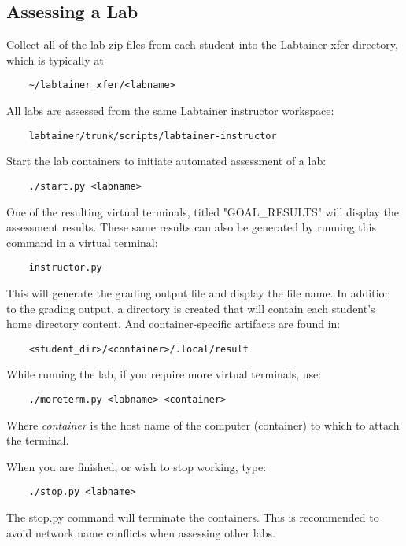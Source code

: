 \documentclass[12pt]{article}
\begin{document}
\subsection{Assessing a Lab}
Collect all of the lab zip files from each student into the Labtainer xfer directory, which
is typically at
\begin{verbatim}
    ~/labtainer_xfer/<labname>
\end{verbatim}
All labs are assessed from the same Labtainer instructor workspace:
\begin{verbatim}
    labtainer/trunk/scripts/labtainer-instructor
\end{verbatim}
\noindent Start the lab containers to initiate automated assessment of a lab:
\begin{verbatim}
    ./start.py <labname>
\end{verbatim}

One of the resulting virtual terminals, titled "GOAL\_RESULTS" will display the assessment results.
These same results can also be generated by running this command in a virtual terminal:
\begin{verbatim}
    instructor.py
\end{verbatim}
\noindent This will generate the grading output file and display the file name.  In
addition to the grading output, a directory is created that will contain each student's
home directory content.  And container-specific artifacts are found in:
\begin{verbatim}
    <student_dir>/<container>/.local/result
\end{verbatim}

\noindent While running the lab, if you require more virtual terminals, use:
\begin{verbatim}
    ./moreterm.py <labname> <container>
\end{verbatim}
\noindent Where \textit{container} is the host name of the computer (container) to which to attach the terminal.

\noindent When you are finished, or wish to stop working, type:
\begin{verbatim}
    ./stop.py <labname>
\end{verbatim}
The stop.py command will terminate the containers.  This is recommended to avoid network
name conflicts when assessing other labs.
\end{document}
